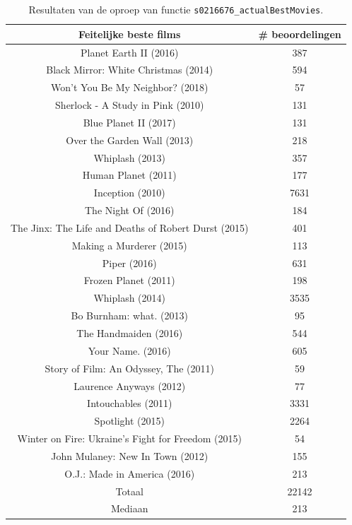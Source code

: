 \begin{table}[H]
\centering
\begin{tabular}{c|c}
\textbf{Feitelijke beste films} & \textbf{\# beoordelingen} \\
\hline
Planet Earth II (2016)                              &  387 \\
Black Mirror: White Christmas (2014)                &  594 \\
Won't You Be My Neighbor? (2018)                    &   57 \\
Sherlock - A Study in Pink (2010)                   &  131 \\
Blue Planet II (2017)                               &  131 \\
Over the Garden Wall (2013)                         &  218 \\
Whiplash (2013)                                     &  357 \\
Human Planet (2011)                                 &  177 \\
Inception (2010)                                    & 7631 \\
The Night Of (2016)                                 &  184 \\
The Jinx: The Life and Deaths of Robert Durst (2015)&  401 \\
Making a Murderer (2015)                            &  113 \\
Piper (2016)                                        &  631 \\
Frozen Planet (2011)                                &  198 \\
Whiplash (2014)                                     & 3535 \\
Bo Burnham: what. (2013)                            &   95 \\
The Handmaiden (2016)                               &  544 \\
Your Name. (2016)                                   &  605 \\
Story of Film: An Odyssey, The (2011)               &   59 \\
Laurence Anyways (2012)                             &   77 \\
Intouchables (2011)                                 & 3331 \\
Spotlight (2015)                                    & 2264 \\
Winter on Fire: Ukraine's Fight for Freedom (2015)  &   54 \\
John Mulaney: New In Town (2012)                    &  155 \\
O.J.: Made in America (2016)                        &  213\\
\hline
Totaal & 22142 \\
Mediaan & 213
\end{tabular}
\caption{Resultaten van de oproep van functie \texttt{s0216676\_actualBestMovies}.}
\label{fig:op16a}
\end{table}

